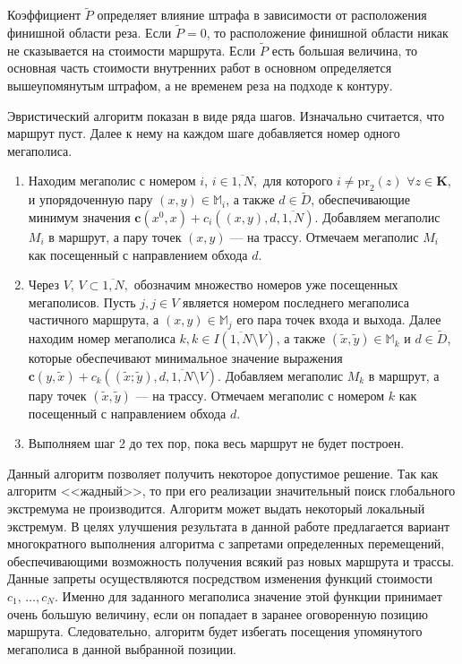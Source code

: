 Коэффициент $\tilde{P}$
определяет влияние штрафа в зависимости от расположения финишной области реза.
Если
$\tilde{P}=0$,
то расположение финишной области никак не
сказывается на стоимости маршрута.
Если $\tilde{P}$
есть большая величина,
то основная часть стоимости внутренних
работ в основном определяется вышеупомянутым штрафом,
а не временем реза на подходе к контуру.

Эвристический алгоритм показан в виде ряда шагов.
Изначально считается, что маршрут пуст.
Далее к нему на каждом шаге добавляется номер одного мегаполиса.

\begin{enumerate}
  \item
  Находим мегаполис с номером $i$, $i\in \overline{1,N},$
  для которого
  $i\neq \mbox{pr}_2(z)$ $\forall z\in \mathbf{K}$,
  и упорядоченную пару
  $(x,y)\in \mathbb{M}_i$,
  а также $d\in \tilde{D}$,
  обеспечивающие минимум значения
  $\mathbf{c}(x^0,x)+c_i((x,y),d,\overline{1,N})$.
  Добавляем мегаполис $M_i$ в маршрут,
  а пару точек $(x,y)$ --- на трассу.
  Отмечаем мегаполис $M_i$ как посещенный с направлением обхода $d$.

  \item
  Через $V$, $V\subset \overline{1,N},$
  обозначим множество номеров уже посещенных мегаполисов.
  Пусть $j,j\in V$
  является номером последнего мегаполиса частичного маршрута,
  а $(x,y)\in \mathbb{M}_j$ его пара точек входа и выхода.
  Далее находим номер мегаполиса
  $k,k\in I(\overline{1,N}\setminus V)$,
  а также
  $(\tilde{x},\tilde{y})\in \mathbb{M}_k$ и $d\in \tilde{D}$,
  которые обеспечивают минимальное значение выражения
  $\mathbf{c}(y,\tilde{x})+c_k((\tilde{x};\tilde{y}),d,\overline{1,N}\setminus V)$.
  Добавляем мегаполис $M_k$ в маршрут, а пару точек $(\tilde{x},\tilde{y})$
  --- на трассу.
  Отмечаем мегаполис с номером $k$ как посещенный с направлением
  обхода $d$.

  \item
  Выполняем шаг 2 до тех пор,
  пока весь маршрут не будет построен.
\end{enumerate}

Данный алгоритм позволяет получить некоторое допустимое решение.
Так как алгоритм <<жадный>>,
то при его реализации значительный поиск глобального экстремума не производится.
Алгоритм может выдать некоторый локальный экстремум.
В целях улучшения результата в данной работе предлагается вариант
многократного выполнения алгоритма с запретами определенных перемещений,
обеспечивающими возможность получения всякий раз новых
маршрута и трассы.
Данные запреты осуществляются посредством изменения функций
стоимости $c_1,\,\dots,c_N$.
Именно для заданного мегаполиса значение этой функции
принимает очень большую величину,
если он попадает в заранее оговоренную позицию маршрута.
Следовательно, алгоритм будет избегать посещения упомянутого мегаполиса
в данной выбранной позиции.

